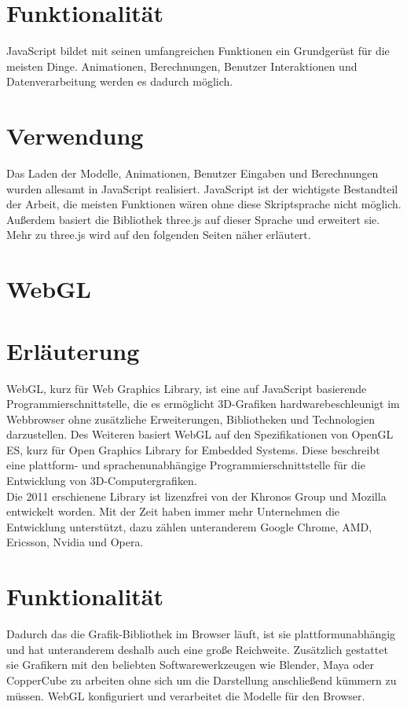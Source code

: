 \section*{Funktionalität}
JavaScript bildet mit seinen umfangreichen Funktionen ein Grundgerüst für die meisten Dinge. Animationen, Berechnungen, Benutzer Interaktionen und Datenverarbeitung werden es dadurch möglich.


\section*{Verwendung}
Das Laden der Modelle, Animationen, Benutzer Eingaben und Berechnungen wurden allesamt in JavaScript realisiert. JavaScript ist der wichtigste Bestandteil der Arbeit, die meisten Funktionen wären ohne diese Skriptsprache nicht möglich.  Außerdem basiert die Bibliothek three.js auf dieser Sprache und erweitert sie. Mehr zu three.js wird auf den folgenden Seiten näher erläutert.


\newpage
\clearpage


\section{WebGL}\label{sec:WebGL}

\section*{Erläuterung}
WebGL, kurz für Web Graphics Library, ist eine auf JavaScript basierende Programmierschnittstelle, die es ermöglicht 3D-Grafiken hardwarebeschleunigt im Webbrowser ohne zusätzliche Erweiterungen, Bibliotheken und Technologien darzustellen. Des Weiteren basiert WebGL auf den Spezifikationen von OpenGL ES, kurz für Open Graphics Library for Embedded Systems. Diese beschreibt eine plattform- und sprachenunabhängige Programmierschnittstelle für die Entwicklung von 3D-Computergrafiken. 
\\
Die 2011 erschienene Library ist lizenzfrei von der Khronos Group und Mozilla entwickelt worden. Mit der Zeit haben immer mehr Unternehmen die Entwicklung unterstützt, dazu zählen unteranderem Google Chrome, AMD, Ericsson, Nvidia und Opera. 


\section*{Funktionalität}
Dadurch das die Grafik-Bibliothek im Browser läuft, ist sie plattformunabhängig und hat unteranderem deshalb auch eine große Reichweite. Zusätzlich gestattet sie Grafikern mit den beliebten Softwarewerkzeugen wie Blender, Maya oder CopperCube zu arbeiten ohne sich um die Darstellung anschließend kümmern zu müssen. WebGL konfiguriert und verarbeitet die Modelle für den Browser.


